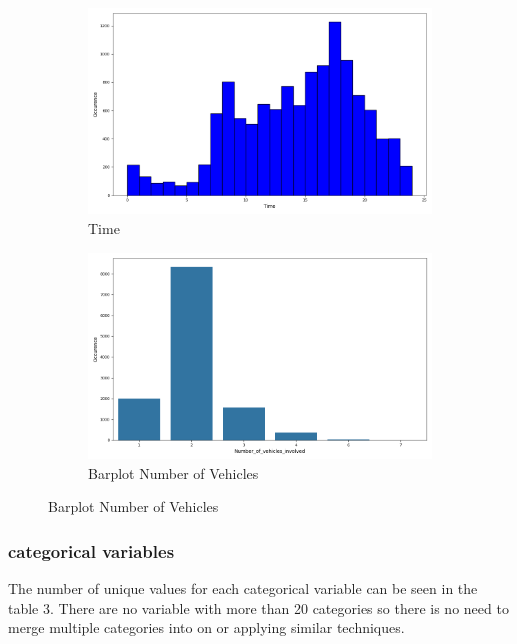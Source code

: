 \documentclass{article}
\begin{document}
\begin{figure}[H]
    \centering
    \begin{subfigure}[b]{0.45\textwidth}
        \centering
        \includegraphics[width=\linewidth]{Time.png} 
        \caption{Time}
        \label{fig:figure1}
    \end{subfigure}
    \hspace{0.05\textwidth}
    \begin{subfigure}[b]{0.45\textwidth}
        \centering
        \includegraphics[width=\linewidth]{Barplot_NumberVehicles.png} 
        \caption{Barplot Number of Vehicles}
        \label{fig:figure2}
    \end{subfigure}
    \label{fig:two_figures}
\end{figure}

\subsubsection{categorical variables}

The number of unique values for each categorical variable can be seen in the table 3. There are no variable with more than 20 categories so there is no need to merge multiple categories into on or applying similar techniques. \newline
\end{document}

